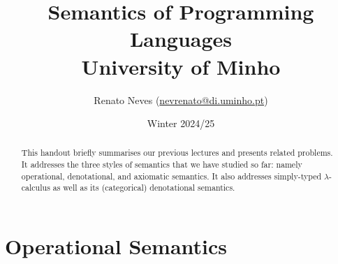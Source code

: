 \documentclass[a4paper, 11pt]{article}
\date{Winter 2024/25}
\theoremstyle{definition}
\begin{document}
\allowdisplaybreaks[2]
\title{\large{Semantics of Programming Languages}
        \\ \large{University of Minho} 
}

\author{\small{Renato Neves} \small
(\href{mailto:nevrenato@di.uminho.pt}{nevrenato@di.uminho.pt})}
\maketitle

\begin{abstract}
This handout briefly summarises our previous lectures and presents related
problems.  It addresses the three styles of semantics that we have studied so
far: namely operational, denotational, and axiomatic semantics. It also
addresses simply-typed $\lambda$-calculus as well as its (categorical)
denotational semantics.
\end{abstract}

\section{Operational Semantics}
\end{document}
